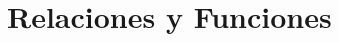 \documentclass[12pt, a4paper, twoside]{book}
\begin{document}
\chapter{Relaciones y Funciones}

% 
% 
% 

% 
% 
% 

% 
% 
% 

% 
% 
% 

% 
% 
% 

% 
% 
% 

% 
% 
% 

% 
% 
% 

% 
% 
% 

% 
% 
% 

% 
% 
% 

% 
% 
% 
\end{document}
